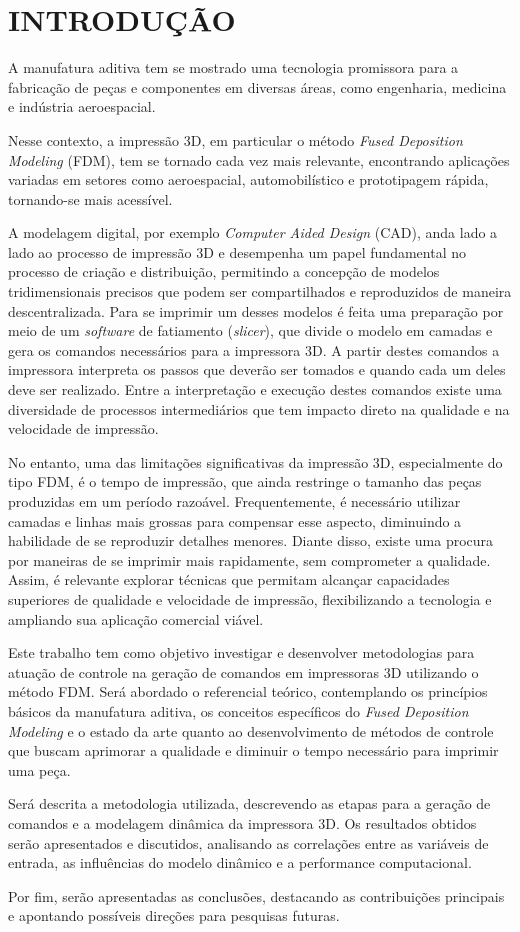 \chapter{INTRODUÇÃO}
A manufatura aditiva tem se mostrado uma tecnologia promissora para a fabricação de peças e componentes em
diversas áreas, como engenharia, medicina e indústria aeroespacial.

Nesse contexto, a impressão 3D, em particular o método 
\textit{Fused Deposition Modeling} (FDM), tem se tornado cada vez mais relevante, encontrando aplicações 
variadas em setores como aeroespacial, automobilístico e prototipagem rápida, tornando-se mais acessível.

A modelagem digital, por exemplo \textit{Computer Aided Design} (CAD), anda lado a lado ao processo de impressão 3D
e desempenha um papel fundamental no processo de criação e distribuição, permitindo a concepção de modelos 
tridimensionais precisos que podem ser compartilhados e reproduzidos de maneira descentralizada. 
Para se imprimir um desses modelos é feita uma preparação por meio de um \textit{software} de fatiamento 
(\textit{slicer}), que divide o modelo em camadas e gera os comandos necessários para a impressora 3D. 
A partir destes comandos a impressora interpreta os passos que deverão ser tomados e quando cada um deles 
deve ser realizado. Entre a interpretação e execução destes comandos existe uma diversidade de processos 
intermediários que tem impacto direto na qualidade e na velocidade de impressão.

No entanto, uma das limitações significativas da impressão 3D, especialmente do tipo FDM, é o tempo de 
impressão, que ainda restringe o tamanho das peças produzidas em um período razoável. Frequentemente, é 
necessário utilizar camadas e linhas mais grossas para compensar esse aspecto, diminuindo a habilidade de
se reproduzir detalhes menores. Diante disso, existe uma procura por maneiras de se imprimir mais rapidamente, 
sem comprometer a qualidade.
Assim, é relevante explorar técnicas que permitam alcançar capacidades superiores de qualidade e 
velocidade de impressão, flexibilizando a tecnologia e ampliando sua aplicação comercial viável. 

Este trabalho tem como objetivo investigar e desenvolver metodologias para atuação de controle na geração de
comandos em impressoras 3D utilizando o método FDM. Será abordado o referencial teórico, contemplando os 
princípios básicos da manufatura aditiva, os conceitos específicos do \textit{Fused Deposition Modeling}
e o estado da 
arte quanto ao desenvolvimento de métodos de controle que buscam aprimorar a qualidade e diminuir o tempo 
necessário para imprimir uma peça.

Será descrita a metodologia utilizada, descrevendo as
etapas para a geração de comandos e a modelagem dinâmica da impressora 3D. Os resultados obtidos serão 
apresentados e discutidos, analisando as correlações entre as variáveis de entrada, as influências do 
modelo dinâmico e a performance computacional.

Por fim, serão apresentadas as conclusões, destacando as contribuições principais e apontando possíveis 
direções para pesquisas futuras.